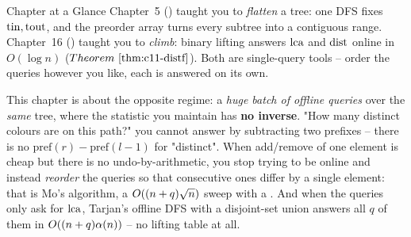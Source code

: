 
\begin{chaptertheorybox}{Chapter at a Glance}
Chapter~5 () taught you to \emph{flatten} a tree: one DFS fixes
\(\operatorname{tin},\operatorname{tout}\), and the preorder array turns every subtree into a contiguous
range.  Chapter~16 () taught you to \emph{climb}: binary lifting
answers \(\operatorname{lca}\) and \(\operatorname{dist}\) online in \(O(\log n)\) (\(\thmref{c11-distf}\)).
Both are single-query tools -- order the queries however you like, each is
answered on its own.

This chapter is about the opposite regime: a \emph{huge batch of offline
queries} over the \emph{same} tree, where the statistic you maintain has
\textbf{no inverse}.  "How many distinct colours are on this path?" you cannot
answer by subtracting two prefixes -- there is no \(\mathrm{pref}(r)-
\mathrm{pref}(l-1)\) for "distinct".  When add/remove of one element is cheap
but there is no undo-by-arithmetic, you stop trying to be online and instead
\emph{reorder} the queries so that consecutive ones differ by a single element:
that is Mo's algorithm, a \(O((n+q)\sqrt n)\) sweep with a
.  And when the queries only ask for \(\operatorname{lca}\), Tarjan's
offline DFS with a disjoint-set union answers all \(q\) of them in
\(O((n+q)\alpha(n))\) -- no lifting table at all.


\end{chaptertheorybox}
